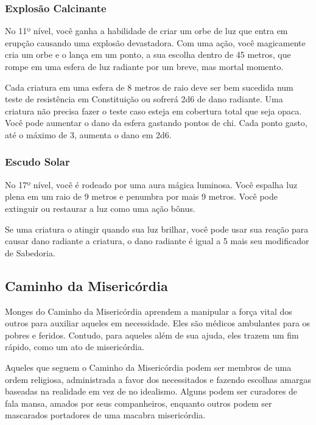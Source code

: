 \begin{multicols}{2}
\subsubsection{Explosão Calcinante}%
\label{ssub:explosao_calcinante}

No 11º nível, você ganha a habilidade de criar um orbe de luz que entra em
erupção causando uma explosão devastadora. Com uma ação, você magicamente cria
um orbe e o lança em um ponto, a sua escolha dentro de 45 metros, que rompe em
uma esfera de luz radiante por um breve, mas mortal momento.

Cada criatura em uma esfera de 8 metros de raio deve ser bem sucedida num teste
de resistência em Constituição ou sofrerá 2d6 de dano radiante. Uma criatura não
precisa fazer o teste caso esteja em cobertura total que seja opaca. Você pode
aumentar o dano da esfera gastando pontos de chi. Cada ponto gasto, até o máximo
de 3, aumenta o dano em 2d6.

\subsubsection*{Escudo Solar}%
\label{ssub:escudo_solar}

No 17º nível, você é rodeado por uma aura mágica luminosa. Você espalha luz
plena em um raio de 9 metros e penumbra por mais 9 metros. Você pode extinguir
ou restaurar a luz como uma ação bônus.

Se uma criatura o atingir quando sua luz brilhar, você pode usar sua reação para
causar dano radiante a criatura, o dano radiante é igual a 5 mais seu
modificador de Sabedoria.

\subsection*{Caminho da Misericórdia}%
\label{sub:caminho_da_misericordia}

Monges do Caminho da Misericórdia aprendem a manipular a força vital dos outros
para auxiliar aqueles em necessidade. Eles são médicos ambulantes para os pobres
e feridos. Contudo, para aqueles além de sua ajuda, eles trazem um fim rápido,
como um ato de misericórdia.

Aqueles que seguem o Caminho da Misericórdia podem ser membros de uma ordem
religiosa, administrada a favor dos necessitados e fazendo escolhas amargas
baseadas na realidade em vez de no idealismo. Alguns podem ser curadores de fala
mansa, amados por seus companheiros, enquanto outros podem ser mascarados
portadores de uma macabra misericórdia.


\end{multicols}
